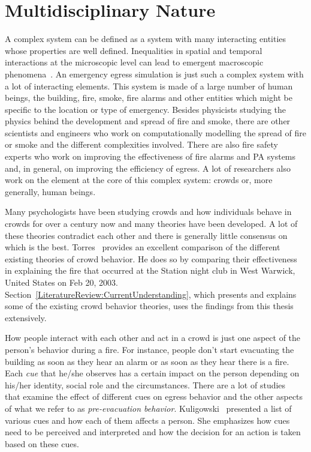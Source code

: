 \section{Multidisciplinary Nature}
\label{LiteratureReiew:MultidisciplinaryNature}

A complex system can be defined as a system with many interacting entities whose properties are well defined. Inequalities in spatial and temporal interactions at the microscopic level can lead to emergent macroscopic phenomena~\cite{Sloot:1997ws}. An emergency egress simulation is just such a complex system with a lot of interacting elements. This system is made of a large number of human beings, the building, fire, smoke, fire alarms and other entities which might be specific to the location or type of emergency. Besides physicists studying the physics behind the development and spread of fire and smoke, there are other scientists and engineers who work on computationally modelling the spread of fire or smoke and the different complexities involved. There are also fire safety experts who work on improving the effectiveness of fire alarms and PA systems and, in general, on improving the efficiency of egress. A lot of researchers also work on the element at the core of this complex system: crowds or, more generally, human beings.

Many psychologists have been studying crowds and how individuals behave in crowds for over a century now and many theories have been developed. A lot of these theories contradict each other and there is generally little consensus on which is the best. Torres~\cite{Torres:2010tj} provides an excellent comparison of the different existing theories of crowd behavior. He does so by comparing their effectiveness in explaining the fire that occurred at the Station night club in West Warwick, United States on Feb 20, 2003. Section~\ref{LiteratureReview:CurrentUnderstanding}, which presents and explains some of the existing crowd behavior theories, uses the findings from this thesis extensively.

How people interact with each other and act in a crowd is just one aspect of the person's behavior during a fire. For instance, people don't start evacuating the building as soon as they hear an alarm or as soon as they hear there is a fire. Each \emph{cue} that he/she observes has a certain impact on the person depending on his/her identity, social role and the circumstances. There are a lot of studies~\cite{Kuligowski:2009un,Ozel:2001tn,Torres:2010tj,Pires:2005gs,Sime:1983uy} that examine the effect of different cues on egress behavior and the other aspects of what we refer to as \emph{pre-evacuation behavior}. Kuligowski~\cite{Kuligowski:2009un} presented a list of various cues and how each of them affects a person. She emphasizes how cues need to be perceived and interpreted and how the decision for an action is taken based on these cues.

